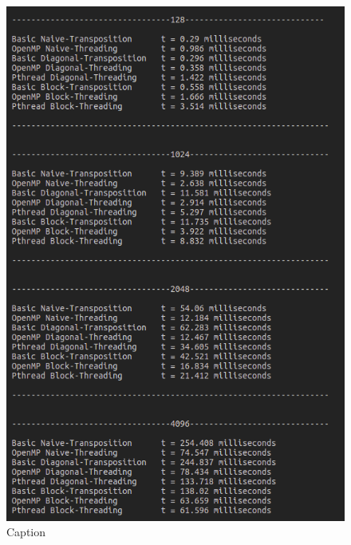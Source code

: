 \documentclass[conference]{IEEEtran}
\begin{document}
\begin{figure}[h!]
    \centering
    \includegraphics[scale = 0.6]{1a.png}
    \caption{Caption}
    \label{fig:my_label}
\end{figure}
\end{document}
